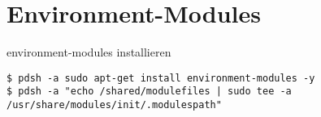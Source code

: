 \chapter{Environment-Modules}
environment-modules installieren
\begin{lstlisting}[style=Bash]
$ pdsh -a sudo apt-get install environment-modules -y
$ pdsh -a "echo /shared/modulefiles | sudo tee -a /usr/share/modules/init/.modulespath"
\end{lstlisting}
